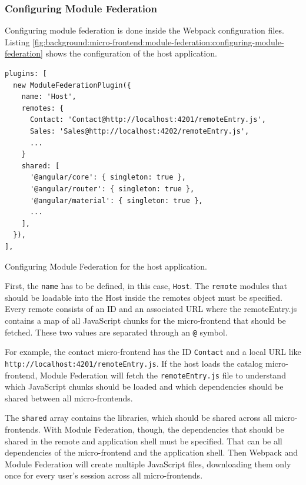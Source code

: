 \subsubsection{Configuring Module Federation}\label{subsubsection:background:micro-frontend:module-federation:configuring-module-federation}

Configuring module federation is done inside the Webpack configuration files. Listing \ref{fig:background:micro-frontend:module-federation:configuring-module-federation} shows the configuration of the host application.

\ifshowListings
\begin{listing}[H]
    \begin{verbatim}
plugins: [
  new ModuleFederationPlugin({
    name: 'Host',
    remotes: {
      Contact: 'Contact@http://localhost:4201/remoteEntry.js',
      Sales: 'Sales@http://localhost:4202/remoteEntry.js',
      ...
    }
    shared: [
      '@angular/core': { singleton: true },
      '@angular/router': { singleton: true },
      '@angular/material': { singleton: true },
      ...
    ],
  }),
],
    \end{verbatim}
    \caption{Configuring Module Federation for the host application.}\label{fig:background:micro-frontend:module-federation:configuring-module-federation}
\end{listing}
\fi

\noindent First, the \texttt{name} has to be defined, in this case, \texttt{Host}. The \texttt{remote} modules that should be loadable into the Host inside the remotes object must be specified. Every remote consists of an ID and an associated URL where the remoteEntry.js contains a map of all JavaScript chunks for the micro-frontend that should be fetched. These two values are separated through an \texttt{@} symbol. \cite[124]{book:2021:mezzalira:applied-methods:building-micro-frontends}

\bigskip

\noindent For example, the contact micro-frontend has the ID \texttt{Contact} and a local URL like \texttt{http:\slash \slash localhost:4201\slash remoteEntry.js}. If the host loads the catalog micro-frontend, Module Federation will fetch the \texttt{remoteEntry.js} file to understand which JavaScript chunks should be loaded and which dependencies should be shared between all micro-frontends. \cite[125]{book:2021:mezzalira:applied-methods:building-micro-frontends}

\bigskip

\noindent The \texttt{shared} array contains the libraries, which should be shared across all micro-frontends. With Module Federation, though, the dependencies that should be shared in the remote and application shell must be specified. That can be all dependencies of the micro-frontend and the application shell. Then Webpack and Module Federation will create multiple JavaScript files, downloading them only once for every user's session across all micro-frontends. \cite[125]{book:2021:mezzalira:applied-methods:building-micro-frontends}

